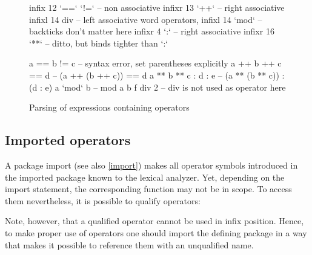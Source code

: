 \begin{figure}
\begin{code}

infix 12 `==` `!=`       -- non associative
infixr 13 `++`           -- right associative
infixl 14 div            -- left associative word operators, 
infixl 14 `mod`          --  backticks don't matter here
infixr 4 `:`             -- right associative
infixr 16 `**`           -- ditto, but binds tighter than `:`

a == b != c              -- syntax error, set parentheses explicitly
a ++ b ++ c  == d        -- (a ++ (b ++ c)) == d
a ** b ** c : d : e      -- (a ** (b ** c)) : (d : e)
a `mod` b                -- mod a b
f div 2                  -- div is not used as operator here
\end{code}
\caption{Parsing of expressions containing operators} \label{exprparse}
\end{figure}

\subsection{Imported operators} \label{importedops}

A package import (see also \autoref{import}) makes all operator symbols introduced in the imported package known to the lexical analyzer. Yet, depending on the import statement, the corresponding function may not be in scope. To access them nevertheless, it is possible to qualify operators:

\begin{flushleft}
   \oder{}   
\end{flushleft}

Note, however, that a qualified operator cannot be used in infix position. Hence, to make proper use of operators one should import the defining package in a way that makes it possible to reference them with an unqualified name.


